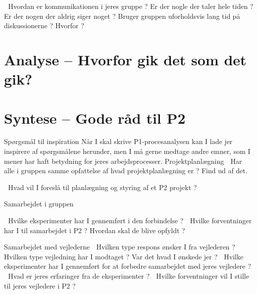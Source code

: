 \documentclass[oneside,a4paper,titlepage]{article}
\begin{document}
 Hvordan er kommunikationen i jeres gruppe ? Er der nogle der taler hele tiden ? Er der nogen der aldrig siger noget ? Bruger gruppen uforholdsvis lang tid på diskussionerne ? Hvorfor ?


\section{Analyse – Hvorfor gik det som det gik?}

\section{Syntese – Gode råd til P2}


Spørgsmål til inspiration
Når I skal skrive P1-procesanalysen kan I lade jer inspirere af spørgsmålene herunder, men I må
gerne medtage andre emner, som I mener har haft betydning for jeres arbejdsprocesser.
Projektplanlægning
 Har alle i gruppen samme opfattelse af hvad projektplanlægning er ? Find ud af det.

 Hvad vil I foreslå til planlægning og styring af et P2 projekt ?

Samarbejdet i gruppen

 Hvilke eksperimenter har I gennemført i den forbindelse ?
 Hvilke forventninger har I til samarbejdet i P2 ? Hvordan skal de blive opfyldt ?

Samarbejdet med vejlederne
 Hvilken type respons ønsker I fra vejlederen ?
 Hvilken type vejledning har I modtaget ? Var det hvad I ønskede jer ?
 Hvilke eksperimenter har I gennemført for at forbedre samarbejdet med jeres vejledere ?
 Hvad er jeres erfaringer fra de eksperimenter ?
 Hvilke forventninger vil I stille til jeres vejledere i P2 ?
\end{document}
